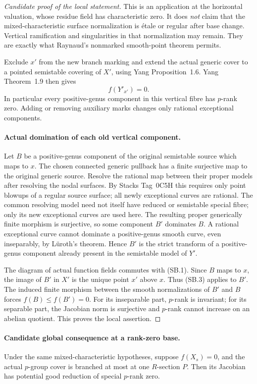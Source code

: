 \begin{proof}[Candidate proof of the local statement]
This is an application at the horizontal valuation, whose
residue field has characteristic zero. It does \emph{not}
claim that the mixed-characteristic surface normalization
is \'etale or regular after base change. Vertical ramification
and singularities in that normalization may remain.
They are exactly what Raynaud's nonmarked smooth-point
theorem permits.

Exclude \(x'\) from the new branch marking and extend the
actual generic cover to a pointed semistable covering of
\(X'\), using Yang Proposition~1.6. Yang Theorem~1.9
then gives
\[
                    f(Y'_{x'})=0.                        \tag{SB.3}
\]
In particular every positive-genus component in this
vertical fibre has \(p\)-rank zero. Adding or removing
auxiliary marks changes only rational exceptional components.

\paragraph{Actual domination of each old vertical component.}
Let \(B\) be a positive-genus component of the original
semistable source which maps to \(x\). The chosen connected
generic pullback has a finite surjective map to the original
generic source. Resolve the rational map between their proper
models after resolving the nodal surfaces. By Stacks Tag~0C5H this requires
only point blowups of a regular source surface; all newly
exceptional curves are rational. The common resolving model
need not itself have reduced or semistable special fibre;
only its new exceptional curves are used here. The resulting proper
generically finite morphism is surjective, so some component
\(B'\) dominates \(B\). A rational exceptional curve
cannot dominate a positive-genus smooth curve, even
inseparably, by L\"uroth's theorem. Hence \(B'\) is the
strict transform of a positive-genus component already
present in the semistable model of \(Y'\).

The diagram of actual function fields commutes with (SB.1).
Since \(B\) maps to \(x\), the image of \(B'\) in
\(X'\) is the unique point \(x'\) above \(x\).
Thus (SB.3) applies to \(B'\). The induced finite morphism
between the smooth normalizations of \(B'\) and \(B\)
forces \(f(B)\le f(B')=0\). For its inseparable part,
\(p\)-rank is invariant; for its separable part, the
Jacobian norm is surjective and \(p\)-rank cannot increase
on an abelian quotient. This proves the local assertion.
\end{proof}

\paragraph{Candidate global consequence at a rank-zero base.}
Under the same mixed-characteristic hypotheses, suppose
\(f(X_s)=0\), and the actual \(p\)-group cover is
branched at most at one \(R\)-section \(P\).
Then its Jacobian has potential good reduction of
special \(p\)-rank zero.

